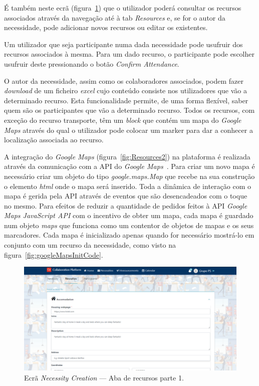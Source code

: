 É também neste ecrã (figura~\ref{fig:Resources1}) que o utilizador poderá consultar os recursos associados através da navegação até à tab \textit{Resources} e, se for o autor da necessidade, pode adicionar novos recursos ou editar os existentes. 
\par
Um utilizador que seja participante numa dada necessidade pode usufruir dos recursos associados à mesma.
Para um dado recurso, o participante pode escolher usufruir deste pressionando o botão \textit{Confirm Attendance}.
\par
O autor da necessidade, assim como os colaboradores associados, podem fazer \textit{download} de um ficheiro \textit{excel} cujo conteúdo consiste nos utilizadores que vão a determinado recurso. 
Esta funcionalidade permite, de uma forma flexível, saber quem são os participantes que vão a determinado recurso.
Todos os recursos, com exceção do recurso transporte, têm um \textit{block} que contém um mapa do \textit{Google Maps} através do qual o utilizador pode colocar um marker para dar a conhecer a localização associada ao recurso. 
\par
A integração do \textit{Google Maps} (figura~\ref{fig:Resources2}) na plataforma é realizada através da comunicação com a API do \textit{Google Maps}~\cite{google maps api}. 
Para criar um novo mapa é necessário criar um objeto do tipo \textit{google.maps.Map} que recebe na sua construção o elemento \textit{html} onde o mapa será inserido. 
Toda a dinâmica de interação com o mapa é gerida pela API através de eventos que são desencadeados com o toque no mesmo. 
Para efeitos de reduzir a quantidade de pedidos feitos à API \textit{Google Maps JavaScript API} com o incentivo de obter um mapa, cada mapa é guardado num objeto \textit{maps} que funciona como um contentor de objetos de mapas e os seus marcadores.
Cada mapa é inicializado apenas quando for necessário mostrá-lo em conjunto com um recurso da necessidade, como visto na figura~\ref{fig:googleMapsInitCode}.

\begin{figure}[H]
  \centering 
  \includegraphics[scale=0.4]{figures/Resources1.png}
  \caption{Ecrã \textit{Necessity Creation} --- Aba de recursos parte 1.}\label{fig:Resources1}
\end{figure}



